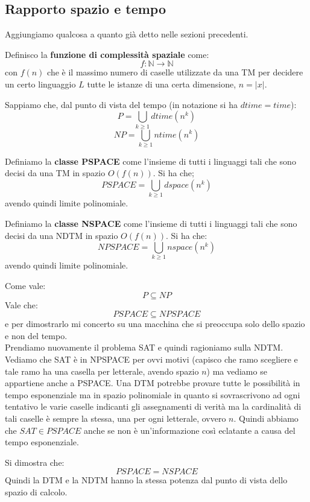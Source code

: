 \subsection{Rapporto spazio e tempo}
Aggiungiamo qualcosa a quanto già detto nelle sezioni precedenti.\\
\begin{definizione}
  Definisco la \textbf{funzione di complessità spaziale} come:
  \[f:\mathbb{N}\to\mathbb{N}\]
  con $f(n)$ che è il massimo numero di caselle utilizzate da una TM per
  decidere un certo linguaggio $L$ tutte le istanze di una certa dimensione,
  $n=|x|$. 
\end{definizione}
Sappiamo che, dal punto di vista del tempo (in notazione si ha $dtime=time$):
\[P=\bigcup_{k\geq 1}dtime(n^k)\]
\[NP=\bigcup_{k\geq 1}ntime(n^k)\]
\begin{definizione}
  Definiamo la \textbf{classe PSPACE} come l'insieme di tutti i linguaggi tali
  che sono decisi da una TM in spazio $O(f(n))$. Si ha che;
  \[PSPACE=\bigcup_{k\geq 1}dspace(n^k)\]
  avendo quindi limite polinomiale.
\end{definizione}
\begin{definizione}
  Definiamo la \textbf{classe NSPACE} come l'insieme di tutti i linguaggi tali
  che sono decisi da una NDTM in spazio $O(f(n))$. Si ha che:
  \[NPSPACE=\bigcup_{k\geq 1}nspace(n^k)\]
  avendo quindi limite polinomiale.
\end{definizione}
Come vale:
\[P\subseteq NP\]
Vale che:
\[PSPACE\subseteq NPSPACE\]
e per dimostrarlo mi concerto su una macchina che si preoccupa solo dello spazio
e non del tempo.\\
Prendiamo nuovamente il problema SAT e quindi ragioniamo sulla NDTM. Vediamo che
SAT è in NPSPACE per ovvi motivi (capisco che ramo scegliere e tale ramo ha una
casella per letterale, avendo spazio $n$) ma vediamo se appartiene anche a
PSPACE. Una DTM potrebbe provare tutte le possibilità in tempo esponenziale ma
in spazio polinomiale in quanto si sovrascrivono ad ogni tentativo le varie
caselle indicanti gli assegnamenti di verità ma la cardinalità di tali caselle è
sempre la stessa, una per ogni letterale, ovvero $n$. Quindi abbiamo che $SAT\in
PSPACE$ anche se non è un'informazione così eclatante a causa del tempo
esponenziale.
\begin{definizione}
  Si dimostra che:
  \[PSPACE=NSPACE\]
  Quindi la DTM e la NDTM hanno la stessa potenza dal punto di vista dello
  spazio di calcolo.
\end{definizione}
